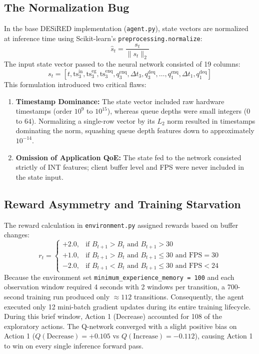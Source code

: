 \documentclass[12pt,a4paper,oneside]{report}
\begin{document}
\subsection{The Normalization Bug}
In the base DESiRED implementation (\texttt{agent.py}), state vectors are normalized at inference time using Scikit-learn's \texttt{preprocessing.normalize}:
\begin{equation}
  \hat{s}_t = \frac{s_t}{\|s_t\|_2}
\end{equation}
The input state vector passed to the neural network consisted of 19 columns:
\begin{equation}
  s_t = \left[ t, \text{ts}_3^{\text{in}}, \text{ts}_3^{\text{eg}}, \text{ts}_3^{\text{enq}}, q_3^{\text{enq}}, \Delta t_3, q_3^{\text{deq}}, \dots, q_1^{\text{enq}}, \Delta t_1, q_1^{\text{deq}} \right]
\end{equation}
This formulation introduced two critical flaws:
\begin{enumerate}[label=\arabic*.]
  \item \textbf{Timestamp Dominance:} The state vector included raw hardware timestamps (order $10^9$ to $10^{15}$), whereas queue depths were small integers ($0$ to $64$). Normalizing a single-row vector by its $L_2$ norm resulted in timestamps dominating the norm, squashing queue depth features down to approximately $10^{-14}$.
  \item \textbf{Omission of Application QoE:} The state fed to the network consisted strictly of INT features; client buffer level and FPS were never included in the state input.
\end{enumerate}

\subsection{Reward Asymmetry and Training Starvation}
The reward calculation in \texttt{environment.py} assigned rewards based on buffer changes:
\begin{equation}
  r_t = 
  \begin{cases}
    +2.0, & \text{if } B_{t+1} > B_t \text{ and } B_{t+1} > 30 \\
    +1.0, & \text{if } B_{t+1} > B_t \text{ and } B_{t+1} \le 30 \text{ and } \text{FPS} = 30 \\
    -2.0, & \text{if } B_{t+1} < B_t \text{ and } B_{t+1} \le 30 \text{ and } \text{FPS} < 24
  \end{cases}
\end{equation}
Because the environment set \texttt{minimum\_experience\_memory = 100} and each observation window required 4 seconds with 2 windows per transition, a 700-second training run produced only $\approx 112$ transitions. Consequently, the agent executed only 12 mini-batch gradient updates during its entire training lifecycle. During this brief window, Action 1 (Decrease) accounted for 108 of the exploratory actions. The Q-network converged with a slight positive bias on Action 1 ($Q(\text{Decrease}) = +0.105$ vs $Q(\text{Increase}) = -0.112$), causing Action 1 to win on every single inference forward pass.
\end{document}
